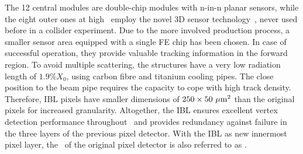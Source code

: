 %
The 12 central modules are double-chip modules with n-in-n planar sensors, 
while the eight outer ones at high \abseta\ employ the novel 3D sensor technology~\cite{Parker3D}, never used before in a collider experiment. Due to the more involved production process, a smaller sensor area equipped with a single \gls{FE} chip has been chosen. In case of successful operation, they provide valuable tracking information in the forward region. 
%
To avoid multiple scattering, the structures have a very low radiation length of $1.9\%X_0$, using carbon fibre and titanium cooling pipes. 
%
The close position to the beam pipe requires the capacity to cope with high track density. Therefore, \gls{IBL} pixels have smaller dimensions of $250\times50~\mu\mathrm{m}^2$ than the original pixels for increased granularity. 
%
Altogether, the \gls{IBL} ensures excellent vertex detection performance throughout \RunTwo\ and provides redundancy against failure in the three layers of the previous pixel detector. 
%
With the \gls{IBL} as new innermost pixel layer, the \blayer\ of the original pixel detector is also referred to as \layerzero. 








